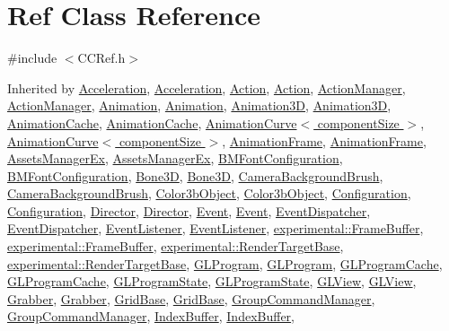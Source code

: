 \hypertarget{classRef}{}\section{Ref Class Reference}
\label{classRef}


{\ttfamily \#include $<$C\+C\+Ref.\+h$>$}



Inherited by \hyperlink{classAcceleration}{Acceleration}, \hyperlink{classAcceleration}{Acceleration}, \hyperlink{classAction}{Action}, \hyperlink{classAction}{Action}, \hyperlink{classActionManager}{Action\+Manager}, \hyperlink{classActionManager}{Action\+Manager}, \hyperlink{classAnimation}{Animation}, \hyperlink{classAnimation}{Animation}, \hyperlink{classAnimation3D}{Animation3D}, \hyperlink{classAnimation3D}{Animation3D}, \hyperlink{classAnimationCache}{Animation\+Cache}, \hyperlink{classAnimationCache}{Animation\+Cache}, \hyperlink{classAnimationCurve}{Animation\+Curve$<$ component\+Size $>$}, \hyperlink{classAnimationCurve}{Animation\+Curve$<$ component\+Size $>$}, \hyperlink{classAnimationFrame}{Animation\+Frame}, \hyperlink{classAnimationFrame}{Animation\+Frame}, \hyperlink{classAssetsManagerEx}{Assets\+Manager\+Ex}, \hyperlink{classAssetsManagerEx}{Assets\+Manager\+Ex}, \hyperlink{classBMFontConfiguration}{B\+M\+Font\+Configuration}, \hyperlink{classBMFontConfiguration}{B\+M\+Font\+Configuration}, \hyperlink{classBone3D}{Bone3D}, \hyperlink{classBone3D}{Bone3D}, \hyperlink{classCameraBackgroundBrush}{Camera\+Background\+Brush}, \hyperlink{classCameraBackgroundBrush}{Camera\+Background\+Brush}, \hyperlink{classColor3bObject}{Color3b\+Object}, \hyperlink{classColor3bObject}{Color3b\+Object}, \hyperlink{classConfiguration}{Configuration}, \hyperlink{classConfiguration}{Configuration}, \hyperlink{classDirector}{Director}, \hyperlink{classDirector}{Director}, \hyperlink{classEvent}{Event}, \hyperlink{classEvent}{Event}, \hyperlink{classEventDispatcher}{Event\+Dispatcher}, \hyperlink{classEventDispatcher}{Event\+Dispatcher}, \hyperlink{classEventListener}{Event\+Listener}, \hyperlink{classEventListener}{Event\+Listener}, \hyperlink{classexperimental_1_1FrameBuffer}{experimental\+::\+Frame\+Buffer}, \hyperlink{classexperimental_1_1FrameBuffer}{experimental\+::\+Frame\+Buffer}, \hyperlink{classexperimental_1_1RenderTargetBase}{experimental\+::\+Render\+Target\+Base}, \hyperlink{classexperimental_1_1RenderTargetBase}{experimental\+::\+Render\+Target\+Base}, \hyperlink{classGLProgram}{G\+L\+Program}, \hyperlink{classGLProgram}{G\+L\+Program}, \hyperlink{classGLProgramCache}{G\+L\+Program\+Cache}, \hyperlink{classGLProgramCache}{G\+L\+Program\+Cache}, \hyperlink{classGLProgramState}{G\+L\+Program\+State}, \hyperlink{classGLProgramState}{G\+L\+Program\+State}, \hyperlink{classGLView}{G\+L\+View}, \hyperlink{classGLView}{G\+L\+View}, \hyperlink{classGrabber}{Grabber}, \hyperlink{classGrabber}{Grabber}, \hyperlink{classGridBase}{Grid\+Base}, \hyperlink{classGridBase}{Grid\+Base}, \hyperlink{classGroupCommandManager}{Group\+Command\+Manager}, \hyperlink{classGroupCommandManager}{Group\+Command\+Manager}, \hyperlink{classIndexBuffer}{Index\+Buffer}, \hyperlink{classIndexBuffer}{Index\+Buffer}, 